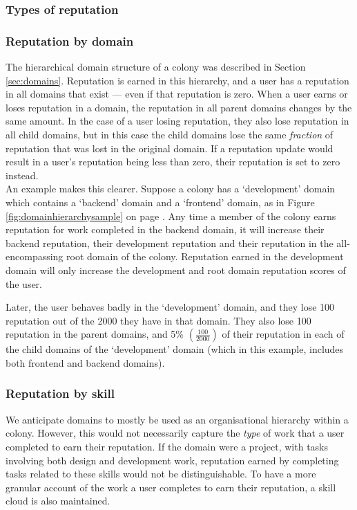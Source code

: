\subsubsection{Types of reputation}

\subsubsection*{Reputation by domain}\label{sec:rep-by-domain}

The hierarchical domain structure of a colony was described in Section \ref{sec:domains}. Reputation is earned in this hierarchy, and a user has a reputation in all domains that exist --- even if that reputation is zero. When a user earns or loses reputation in a domain, the reputation in all parent domains changes by the same amount. In the case of a user losing reputation, they also lose reputation in all child domains, but in this case the child domains lose the same \textit{fraction} of reputation that was lost in the original domain. If a reputation update would result in a user's reputation being less than zero, their reputation is set to zero instead. \\

An example makes this clearer. Suppose a colony has a `development' domain which contains a `backend' domain and a `frontend' domain, as in Figure \ref{fig:domainhierarchysample} on page \pageref{fig:domainhierarchysample}. Any time a member of the colony earns reputation for work completed in the backend domain, it will increase their backend reputation, their development reputation and their reputation in the all-encompassing root domain of the colony. Reputation earned in the development domain will only increase the development and root domain reputation scores of the user.

Later, the user behaves badly in the `development' domain, and they lose 100 reputation out of the 2000 they have in that domain. They also lose 100 reputation in the parent domains, and 5\% $\left(\frac{100}{2000}\right)$ of their reputation in each of the child domains of the `development' domain (which in this example, includes both frontend and backend domains).

\subsubsection*{Reputation by skill}\label{sec:rep-by-skill}

We anticipate domains to mostly be used as an organisational hierarchy within a colony. However, this would not necessarily capture the \emph{type} of work that a user completed to earn their reputation. If the domain were a project, with tasks involving both design and development work, reputation earned by completing tasks related to these skills would not be distinguishable. To have a more granular account of the work a user completes to earn their reputation, a skill cloud is also maintained.

